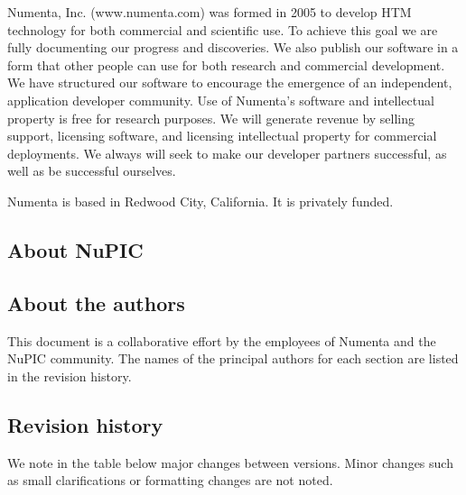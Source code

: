 \documentclass{report}
\begin{document}
Numenta, Inc. (www.numenta.com) was formed in 2005 to develop HTM
technology for both commercial and scientific use. To achieve this
goal we are fully documenting our progress and discoveries. We also
publish our software in a form that other people can use for both
research and commercial development. We have structured our software
to encourage the emergence of an independent, application developer
community. Use of Numenta's software and intellectual property is free
for research purposes. We will generate revenue by selling support,
licensing software, and licensing intellectual property for commercial
deployments. We always will seek to make our developer partners
successful, as well as be successful ourselves.

Numenta is based in Redwood City, California. It is privately funded.

\subsection*{About NuPIC}



\subsection*{About the authors}

This document is a collaborative effort by the employees of
Numenta and the NuPIC community. The names of the principal authors for each section are
listed in the revision history.

\pagebreak
\subsection*{Revision history}

We note in the table below major changes between versions. Minor
changes such as small clarifications or formatting changes are not
noted.
\end{document}
